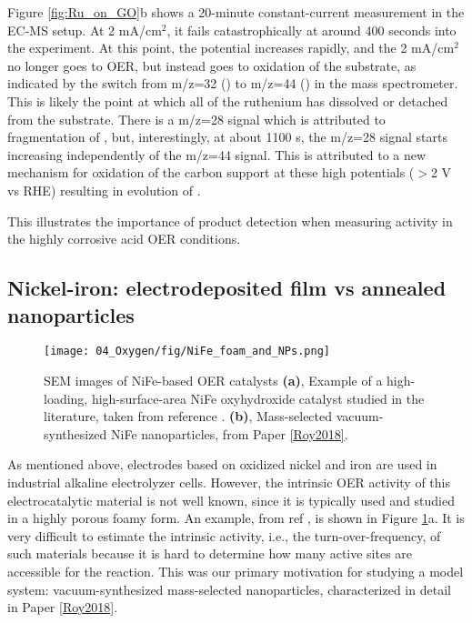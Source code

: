 Figure \ref{fig:Ru_on_GO}b shows a 20-minute constant-current measurement in the EC-MS setup. At 2 mA/cm$^2$, it fails catastrophically at around 400 seconds into the experiment. At this point, the potential increases rapidly, and the 2 mA/cm$^2$ no longer goes to OER, but instead goes to oxidation of the substrate, as indicated by the switch from m/z=32 () to m/z=44 () in the mass spectrometer. This is likely the point at which all of the ruthenium has dissolved or detached from the substrate. There is a m/z=28 signal which is attributed to fragmentation of , but, interestingly, at about 1100 s, the m/z=28 signal starts increasing independently of the m/z=44 signal. This is attributed to a new mechanism for oxidation of the carbon support at these high potentials ($>$2 V vs RHE) resulting in evolution of . 

This illustrates the importance of product detection when measuring activity in the highly corrosive acid OER conditions.

\subsection{Nickel-iron: electrodeposited film vs annealed nanoparticles}\label{subsec:NiFe}

\begin{figure}[h]
	\centering
	\texttt{[image: 04\_Oxygen/fig/NiFe\_foam\_and\_NPs.png]}
	\caption{SEM images of NiFe-based OER catalysts \textbf{(a)}, Example of a high-loading, high-surface-area NiFe oxyhydroxide catalyst studied in the literature, taken from reference . \textbf{(b)}, Mass-selected vacuum-synthesized NiFe nanoparticles, from Paper \ref{Roy2018}.}
	\label{fig:NiFe_foam_and_NPs}
\end{figure}

As mentioned above, electrodes based on oxidized nickel and iron are used in industrial alkaline electrolyzer cells. However, the intrinsic OER activity of this electrocatalytic material is not well known, since it is typically used and studied in a highly porous foamy form\cite{Dionigi2016b}. An example, from ref , is shown in Figure \ref{fig:NiFe_foam_and_NPs}a. It is very difficult to estimate the intrinsic activity, i.e., the turn-over-frequency, of such materials because it is hard to determine how many active sites are accessible for the reaction. This was our primary motivation for studying a model system: vacuum-synthesized mass-selected  nanoparticles, characterized in detail in Paper \ref{Roy2018}.

